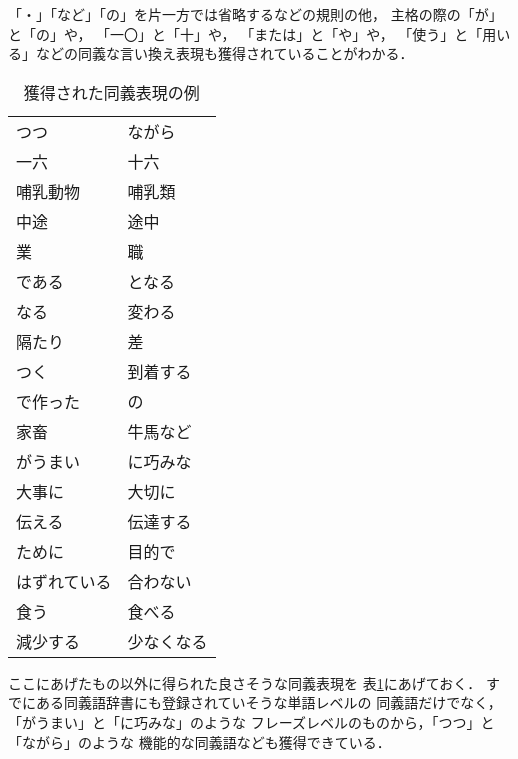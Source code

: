 「・」「など」「の」を片一方では省略するなどの規則の他，
主格の際の「が」と「の」や，
「一〇」と「十」や，
「または」と「や」や，
「使う」と「用いる」などの同義な言い換え表現も獲得されていることがわかる．

\begin{table}[t]
\renewcommand{\arraystretch}{}
  \begin{center}
    \leavevmode
    \caption{獲得された同義表現の例}
    \label{tab:jisho_sabun_result_yoi}
\begin{tabular}[h]{|l|l|}\hline
つつ                 & ながら\\
一六                 & 十六\\
哺乳動物             & 哺乳類\\
中途                 & 途中\\
業                   & 職\\
である               & となる\\
なる                 & 変わる\\
隔たり               & 差\\
つく                 & 到着する\\
で作った             & の\\
家畜                 & 牛馬など\\
がうまい             & に巧みな\\
大事に               & 大切に\\
伝える               & 伝達する\\
ために               & 目的で\\
はずれている         & 合わない\\
食う                 & 食べる\\
減少する             & 少なくなる\\\hline
\end{tabular}
  \end{center}
\end{table}

ここにあげたもの以外に得られた良さそうな同義表現を
表\ref{tab:jisho_sabun_result_yoi}にあげておく．
すでにある同義語辞書にも登録されていそうな単語レベルの
同義語だけでなく，「がうまい」と「に巧みな」のような
フレーズレベルのものから，「つつ」と「ながら」のような
機能的な同義語なども獲得できている．

